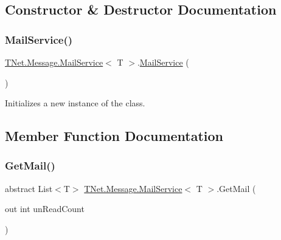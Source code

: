 \subsection{Constructor \& Destructor Documentation}
\mbox{\label{class_t_net_1_1_message_1_1_mail_service_a1dca54bac3380cfca71c53893be4f529}} 
\subsubsection{\texorpdfstring{Mail\+Service()}{MailService()}}
{\footnotesize\ttfamily \mbox{\hyperlink{class_t_net_1_1_message_1_1_mail_service}{T\+Net.\+Message.\+Mail\+Service}}$<$ T $>$.\mbox{\hyperlink{class_t_net_1_1_message_1_1_mail_service}{Mail\+Service}} (\begin{DoxyParamCaption}{ }\end{DoxyParamCaption})\hspace{0.3cm}{\ttfamily [protected]}}



Initializes a new instance of the class. 



\subsection{Member Function Documentation}
\mbox{\label{class_t_net_1_1_message_1_1_mail_service_ac933afe67fdb7c55c59b1a2a07e76866}} 
\subsubsection{\texorpdfstring{Get\+Mail()}{GetMail()}}
{\footnotesize\ttfamily abstract List$<$T$>$ \mbox{\hyperlink{class_t_net_1_1_message_1_1_mail_service}{T\+Net.\+Message.\+Mail\+Service}}$<$ T $>$.Get\+Mail (\begin{DoxyParamCaption}\item[{out int}]{un\+Read\+Count }\end{DoxyParamCaption})\hspace{0.3cm}{\ttfamily [pure virtual]}}



